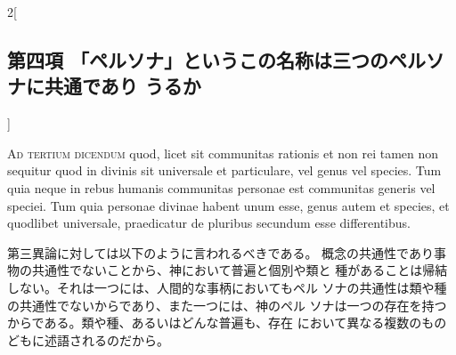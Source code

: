 \documentclass[paper=a4paper,fontsize=10pt,jafontsize=9pt,titlepage]{jlreq}
\begin{document}
\begin{paracol}{2}[\subsection{第四項 「ペルソナ」というこの名称は三つのペルソナに共通であり うるか}]
\switchcolumn*[\subsection{ad.3}]


{\scshape Ad tertium dicendum} quod, licet sit communitas rationis et non rei
tamen non sequitur quod in divinis sit universale et particulare, vel
genus vel species. Tum quia neque in rebus humanis communitas personae
est communitas generis vel speciei. Tum quia personae divinae habent
unum esse, genus autem et species, et quodlibet universale,
praedicatur de pluribus secundum esse differentibus.


\switchcolumn


第三異論に対しては以下のように言われるべきである。
概念の共通性であり事物の共通性でないことから、神において普遍と個別や類と
 種があることは帰結しない。それは一つには、人間的な事柄においてもペル
 ソナの共通性は類や種の共通性でないからであり、また一つには、神のペル
 ソナは一つの存在を持つからである。類や種、あるいはどんな普遍も、存在
 において異なる複数のものどもに述語されるのだから。


\switchcolumn*



\end{paracol}
\newpage
\end{document}
